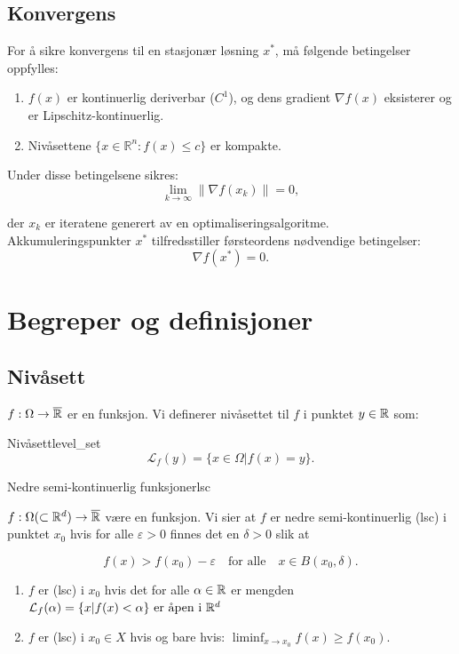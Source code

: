 \documentclass[11pt, a4paper]{article}
\begin{document}
\subsection*{Konvergens}
For å sikre konvergens til en stasjonær løsning \( x^* \), må følgende betingelser oppfylles:
\begin{enumerate}
  \item \( f(x) \) er kontinuerlig deriverbar (\( C^1 \)), og dens gradient \( \nabla f(x) \) eksisterer og er Lipschitz-kontinuerlig.
  \item Nivåsettene \( \{x \in \mathbb{R}^n : f(x) \leq c\} \) er kompakte.
\end{enumerate}

Under disse betingelsene sikres:
\[
  \lim_{k \to \infty} \|\nabla f(x_k)\| = 0,
\]

der \( x_k \) er iteratene generert av en optimaliseringsalgoritme. Akkumuleringspunkter \( x^* \) tilfredsstiller førsteordens nødvendige betingelser:
\[
  \nabla f(x^*) = 0.
\]

\section{Begreper og definisjoner}

\subsection{Nivåsett}

$f: \Omega \to \overline{\mathbb{R}}$ er en funksjon. Vi definerer nivåsettet til $f$ i punktet $y \in \mathbb{R}$ som:

\begin{definition}{Nivåsett}{level_set}
  \[
    \mathcal{L}_f(y) = \{x \in \Omega | f(x) = y\}.
  \]
\end{definition}

\begin{definition}{Nedre semi-kontinuerlig funksjoner}{lsc}

  $f: \Omega (\subset \mathbb{R}^d) \to \overline{\mathbb{R}}$ være en funksjon. Vi sier at $f$ er nedre semi-kontinuerlig (lsc) i punktet $x_0$ hvis for alle $\varepsilon > 0$ finnes det en $\delta > 0$ slik at

  \[
    f(x) > f(x_0) - \varepsilon \quad \text{for alle} \quad x \in B(x_0, \delta).
  \]

  \begin{enumerate}
    \item $f$ er (lsc) i $x_0$ hvis det for alle $\alpha \in \mathbb{R}$ er mengden $\mathcal{L}_f(\alpha) = \{x | f(x) < \alpha \} \text{ er åpen i } \mathbb{R}^d$
    \item $f$ er (lsc) i $x_0 \in X$ hvis og bare hvis: $\liminf_{x \to x_0} f(x) \geq f(x_0)$.
  \end{enumerate}

\end{definition}
\end{document}
